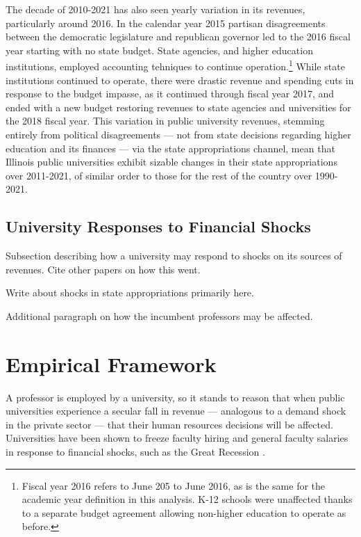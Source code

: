 \documentclass[notitlepage,12pt]{article}
\begin{document}
The decade of 2010-2021 has also seen yearly variation in its revenues, particularly around 2016.
In the calendar year 2015 partisan disagreements between the democratic legislature and republican governor led to the 2016 fiscal year starting with no state budget.
State agencies, and higher education institutions, employed accounting tehniques to continue operation.\footnote{
    Fiscal year 2016 refers to June 205 to June 2016, as is the same for the academic year definition in this analysis. 
    K-12 schools were unaffected thanks to a separate budget agreement allowing non-higher education to operate as before.
}
While state institutions continued to operate, there were drastic revenue and spending cuts in response to the budget impasse, as it continued through fiscal year 2017, and ended with a new budget restoring revenues to state agencies and universities for the 2018 fiscal year.
This variation in public university revenues, stemming entirely from political disagreements --- not from state decisions regarding higher education and its finances \citep{young2020squandered} --- via the state appropriations channel, mean that Illinois public universities exhibit sizable changes in their state appropriations over 2011-2021, of similar order to those for the rest of the country over 1990-2021.


\subsection{University Responses to Financial Shocks}
\label{sec:responses}
Subsection describing how a university may respond to shocks on its sources of revenues.
Cite other papers on how this went.

Write about shocks in state appropriations primarily here.

Additional paragraph on how the incumbent professors may be affected.


\section{Empirical Framework}
\label{sec:empirics}

A professor is employed by a university, so it stands to reason that when public universities experience a secular fall in revenue --- analogous to a demand shock in the private sector --- that their human resources decisions will be affected.
Universities have been shown to freeze faculty hiring and general faculty salaries in response to financial shocks, such as the Great Recession \citep{turner2014impact}.
\end{document}
